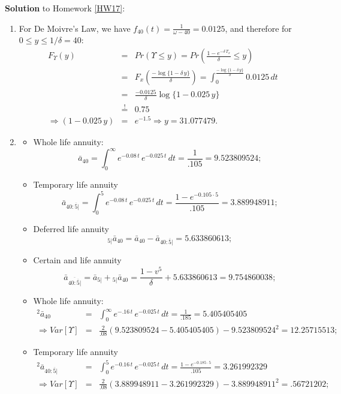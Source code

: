 \documentclass[11pt,fleqn,oneside]{book}
\begin{document}
\noindent \textbf{Solution} to Homework \ref{HW17}:
\footnotesize
\begin{enumerate}
\item For De Moivre's Law, we have $f_{40}(t) = \frac{1}{\omega - 40} = 0.0125$, and therefore for $0 \leq y \leq 1/\delta = 40$:
\begin{eqnarray*}
F_{\Upsilon}(y) &=& Pr(\Upsilon \leq y) = Pr\left(\frac{1-e^{-\delta\,T_x}}{\delta} \leq y\right)\\
&=& F_{x}\left(\frac{-\log\{1-\delta\,y\}}{\delta}\right) = 
\int_0^{\frac{-\log\{1-\delta\,y\}}{\delta}} 0.0125\,dt \\
&=& \frac{-0.0125}{\delta}\log\{1-0.025\,y\}\\ 
&\stackrel{!}{=}& {0.75}\\
\Rightarrow (1-0.025\,y) &=& e^{-1.5} \Rightarrow y = 31.077479.
\end{eqnarray*}
\item 
\begin{itemize}
\item Whole life annuity:
$$
{\bar{a}_{40}} = \int_0^{\infty} e^{-0.08\,t}\,e^{-0.025\,t}\,dt = \frac{1}{.105} = 9.523809524;
$$
\item Temporary life annuity
$$
{\bar{a}_{40:\overline{5}|}} = \int_0^{5} e^{-0.08\,t}\,e^{-0.025\,t}\,dt = \frac{1 - e^{-0.105\cdot 5}}{.105} = 3.889948911;
$$
\item Deferred life annuity
$$
{_{5|}\bar{a}_{40}} = {\bar{a}_{40}} - {\bar{a}_{40:\overline{5}|}}  = 5.633860613;
$$
\item Certain and life annuity
$$
{\bar{a}_{\overline{40:\overline{5}|}}} = {\bar{a}_{5|}} +  {_{5|}\bar{a}_{40}} = \frac{1-v^5}{\delta} + 5.633860613 = 9.754860038;
$$
\item Whole life annuity:
\begin{eqnarray*}
{^2\bar{a}_{40}} &=& \int_0^{\infty} e^{-.16\,t}\,e^{-0.025\,t}\,dt = \frac{1}{.185} = 5.405405405\\
\Rightarrow Var[\Upsilon] &=& \frac{2}{.08}\left(9.523809524 - 5.405405405\right) - 9.523809524^2
=12.25715513;
\end{eqnarray*}
\item Temporary life annuity
\begin{eqnarray*}
{^2\bar{a}_{40:\overline{5}|}} &=& \int_0^{5} e^{-0.16\,t}\,e^{-0.025\,t}\,dt = \frac{1 - e^{-0.185\cdot 5}}{.105} = 3.261992329\\
\Rightarrow Var[\Upsilon] &=& \frac{2}{.08}\left(3.889948911 - 3.261992329\right) - 3.889948911^2
= .56721202;

\end{eqnarray*}
\end{itemize}
\end{enumerate}
\end{document}
